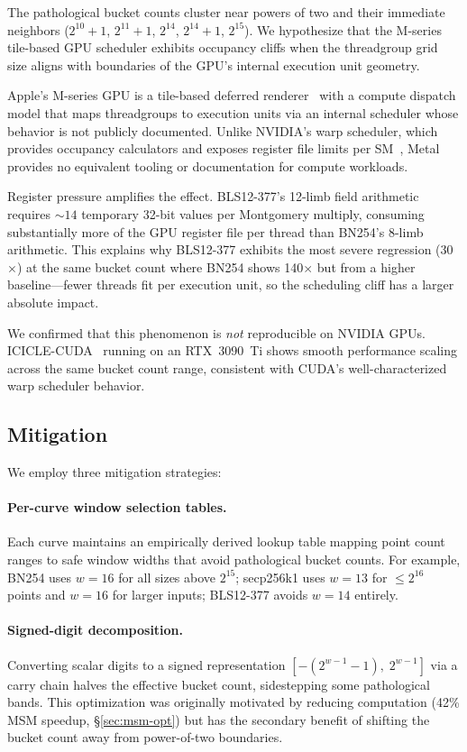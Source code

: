 The pathological bucket counts cluster near powers of two and their immediate
neighbors ($2^{10}{+}1$, $2^{11}{+}1$, $2^{14}$, $2^{14}{+}1$, $2^{15}$). We
hypothesize that the M-series tile-based GPU scheduler exhibits occupancy cliffs
when the threadgroup grid size aligns with boundaries of the GPU's internal
execution unit geometry.

Apple's M-series GPU is a tile-based deferred renderer~\cite{apple-gpu-arch}
with a compute dispatch model that maps threadgroups to execution units via an
internal scheduler whose behavior is not publicly documented. Unlike NVIDIA's
warp scheduler, which provides occupancy calculators and exposes register file
limits per SM~\cite{cuda-occupancy}, Metal provides no equivalent tooling or
documentation for compute workloads.

Register pressure amplifies the effect. BLS12-377's 12-limb field arithmetic
requires ${\sim}14$ temporary 32-bit values per Montgomery multiply, consuming
substantially more of the GPU register file per thread than BN254's 8-limb
arithmetic. This explains why BLS12-377 exhibits the most severe regression
(30$\times$) at the same bucket count where BN254 shows 140$\times$ but from a
higher baseline---fewer threads fit per execution unit, so the scheduling cliff
has a larger absolute impact.

We confirmed that this phenomenon is \emph{not} reproducible on NVIDIA GPUs.
ICICLE-CUDA~\cite{icicle} running on an RTX~3090~Ti shows smooth performance
scaling across the same bucket count range, consistent with CUDA's well-characterized
warp scheduler behavior.

\subsection{Mitigation}

We employ three mitigation strategies:

\paragraph{Per-curve window selection tables.}
Each curve maintains an empirically derived lookup table mapping point count
ranges to safe window widths that avoid pathological bucket counts. For example,
BN254 uses $w{=}16$ for all sizes above $2^{15}$; secp256k1 uses $w{=}13$ for
$\leq 2^{16}$ points and $w{=}16$ for larger inputs; BLS12-377 avoids $w{=}14$
entirely.

\paragraph{Signed-digit decomposition.}
Converting scalar digits to a signed representation $[{-}(2^{w-1}{-}1),\;
2^{w-1}]$ via a carry chain halves the effective bucket count, sidestepping some
pathological bands. This optimization was originally motivated by reducing
computation (42\% MSM speedup, \S\ref{sec:msm-opt}) but has the secondary
benefit of shifting the bucket count away from power-of-two boundaries.

